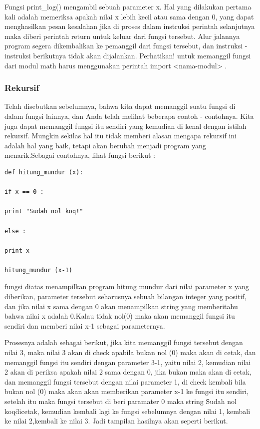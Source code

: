 Fungsi print\_log() mengambil sebuah parameter x. Hal yang dilakukan pertama kali adalah memeriksa apakah nilai x lebih kecil atau sama dengan 0, yang dapat menghasilkan pesan kesalahan jika di proses dalam instruksi perintah selanjutnya maka diberi perintah return untuk keluar dari fungsi tersebut. Alur jalannya program segera dikembalikan ke pemanggil dari fungsi tersebut, dan instruksi - instruksi berikutnya tidak akan dijalankan. Perhatikan! untuk memanggil fungsi dari modul math harus menggunakan perintah import <nama-modul> .

 \subsubsection{Rekursif}

Telah disebutkan sebelumnya, bahwa kita dapat memanggil suatu fungsi di dalam fungsi lainnya, dan Anda telah melihat beberapa contoh - contohnya. Kita juga dapat memanggil fungsi itu sendiri yang kemudian di kenal dengan istilah rekursif. Mungkin sekilas hal itu tidak memberi alasan mengapa rekursif ini adalah hal yang baik, tetapi akan berubah menjadi program yang menarik.Sebagai contohnya, lihat 
fungsi berikut :

\begin{verbatim}
def hitung_mundur (x):

if x == 0 :

print "Sudah nol koq!"

else :

print x

hitung_mundur (x-1)
 \end{verbatim}
 
fungsi diatas menampilkan program hitung mundur dari nilai parameter x yang diberikan, parameter tersebut seharusnya sebuah bilangan integer yang positif, dan jika nilai x sama dengan 0 akan menampilkan string yang memberitahu bahwa nilai x adalah 0.Kalau tidak nol(0) maka akan memanggil fungsi itu sendiri dan memberi nilai x-1 sebagai parameternya.

Prosesnya adalah sebagai berikut, jika kita memanggil fungsi tersebut dengan nilai 3, maka nilai 3 akan di check apabila bukan nol (0) maka akan di cetak, dan memanggil fungsi itu sendiri dengan parameter 3-1, yaitu nilai 2, kemudian nilai 2 akan di periksa apakah nilai 2 sama dengan 0, jika bukan maka akan di cetak, dan memanggil fungsi tersebut dengan nilai parameter 1, di check kembali bila bukan
nol (0) maka akan akan memberikan parameter x-1 ke fungsi itu sendiri, setelah itu maka fungsi tersebut di beri paramater 0 maka string \"Sudah nol koq\" dicetak, kemudian kembali lagi ke fungsi sebelumnya dengan nilai 1, kembali ke nilai 2,kembali ke nilai 3.
Jadi tampilan hasilnya akan seperti berikut.


